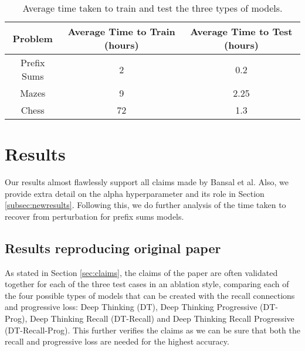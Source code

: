 \begin{table}[h!]
\begin{center}
\begin{tabular}{ |c|c|c| } 
 \hline
 Problem & Average Time to Train (hours) & Average Time to Test (hours) \\ \hline
 Prefix Sums & 2 & 0.2 \\ \hline
 Mazes & 9 & 2.25 \\ \hline
 Chess & 72 & 1.3 \\ 
 \hline
\end{tabular}
\caption{Average time taken to train and test the three types of models.}
\label{table:timings}
\end{center}
\end{table}

\section{Results}
\label{sec:results}
Our results almost flawlessly support all claims made by Bansal et al. Also, we provide extra detail on the alpha hyperparameter and its role in Section \ref{subsec:newresults}. Following this, we do further analysis of the time taken to recover from perturbation for prefix sums models.

\subsection{Results reproducing original paper}
\label{subsec:resultsrepro}
As stated in Section \ref{sec:claims}, the claims of the paper are often validated together for each of the three test cases in an ablation style, comparing each of the four possible types of models that can be created with the recall connections and progressive loss: Deep Thinking (DT), Deep Thinking Progressive (DT-Prog), Deep Thinking Recall (DT-Recall) and Deep Thinking Recall Progressive (DT-Recall-Prog). This further verifies the claims as we can be sure that both the recall and progressive loss are needed for the highest accuracy.

